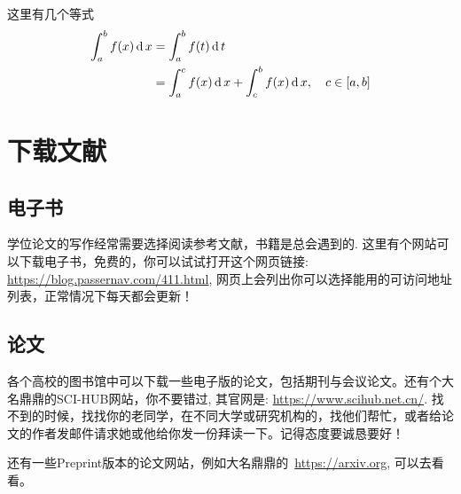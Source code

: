 这里有几个等式
\begin{equation}
	\begin{split}
		\int^b_a f(x)\operatorname{\mathrm{d}} x 
		& = \int^b_a f(t)\operatorname{\mathrm{d}} t \\
		& = \int^c_a f(x)\operatorname{\mathrm{d}} x + \int^b_c f(x)\operatorname{\mathrm{d}} x, \quad c\in [a,b] 
	\end{split}
\end{equation}

\section{下载文献}

\subsection{电子书}

学位论文的写作经常需要选择阅读参考文献，书籍是总会遇到的. 这里有个网站可以下载电子书，免费的，你可以试试打开这个网页链接: \url{https://blog.passernav.com/411.html}, 网页上会列出你可以选择能用的可访问地址列表，正常情况下每天都会更新！ 

\subsection{论文}

各个高校的图书馆中可以下载一些电子版的论文，包括期刊与会议论文。还有个大名鼎鼎的SCI-HUB网站，你不要错过, 其官网是: \url{https://www.scihub.net.cn/}.
找不到的时候，找找你的老同学，在不同大学或研究机构的，找他们帮忙，或者给论文的作者发邮件请求她或他给你发一份拜读一下。记得态度要诚恳要好！

还有一些Preprint版本的论文网站，例如大名鼎鼎的~\url{https://arxiv.org}, 可以去看看。
